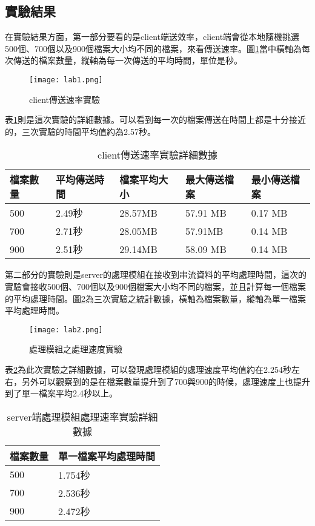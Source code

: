 \subsection{實驗結果}
在實驗結果方面，第一部分要看的是client端送效率，client端會從本地隨機挑選500個、700個以及900個檔案大小均不同的檔案，來看傳送速率。圖\ref{lab1}當中橫軸為每次傳送的檔案數量，縱軸為每一次傳送的平均時間，單位是秒。\\\par
\begin{figure}[H]
\centering
\graphicspath{{/Users/FUDA/Documents/masterThesis/image/}}
\texttt{[image: lab1.png]}
\caption{client傳送速率實驗}
\label{lab1}
\end{figure}
表\ref{lab1table}則是這次實驗的詳細數據。可以看到每一次的檔案傳送在時間上都是十分接近的，三次實驗的時間平均值約為2.57秒。\\\par
\begin{table}[H]
\caption{client傳送速率實驗詳細數據}
\label{lab1table}
\begin{center}
\begin{tabular}{|p{2cm}<{\centering}|p{2.7cm}<{\centering}|p{2.7cm}<{\centering}|p{2.7cm}<{\centering}|p{2.7cm}<{\centering}|}
\hline
檔案數量 & 平均傳送時間 & 檔案平均大小 & 最大傳送檔案 & 最小傳送檔案\\
\hline
500 & 2.49秒 & 28.57MB & 57.91 MB & 0.17 MB\\
\hline
700 & 2.71秒 & 28.05MB & 57.91MB & 0.14 MB\\
\hline
900 & 2.51秒 & 29.14MB& 58.09 MB & 0.14 MB\\
\hline
\end{tabular}
\end{center}
\end{table}
\newpage
第二部分的實驗則是server的處理模組在接收到串流資料的平均處理時間，這次的實驗會接收500個、700個以及900個檔案大小均不同的檔案，並且計算每一個檔案的平均處理時間。圖\ref{lab2}為三次實驗之統計數據，橫軸為檔案數量，縱軸為單一檔案平均處理時間。
\begin{figure}[H]
\centering
\graphicspath{{/Users/FUDA/Documents/masterThesis/image/}}
\texttt{[image: lab2.png]}
\caption{處理模組之處理速度實驗}
\label{lab2}
\end{figure}
表\ref{lab2table}為此次實驗之詳細數據，可以發現處理模組的處理速度平均值約在2.254秒左右，另外可以觀察到的是在檔案數量提升到了700與900的時候，處理速度上也提升到了單一檔案平均2.4秒以上。
\begin{table}[H]
\caption{server端處理模組處理速率實驗詳細數據}
\label{lab2table}
\begin{center}
\begin{tabular}{|p{3cm}<{\centering}|p{3cm}<{\centering}|}
\hline
檔案數量 & 單一檔案平均處理時間\\
\hline
500 & 1.754秒 \\
\hline
700 & 2.536秒 \\
\hline
900 & 2.472秒 \\
\hline
\end{tabular}
\end{center}
\end{table}

